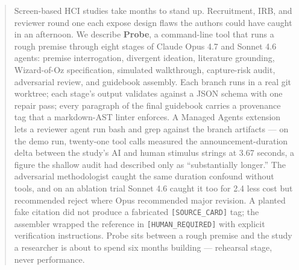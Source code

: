 \begin{abstract}
Screen-based HCI studies take months to stand up. Recruitment, IRB, and reviewer round one each expose design flaws the authors could have caught in an afternoon. We describe \textbf{Probe}, a command-line tool that runs a rough premise through eight stages of Claude Opus 4.7 and Sonnet 4.6 agents: premise interrogation, divergent ideation, literature grounding, Wizard-of-Oz specification, simulated walkthrough, capture-risk audit, adversarial review, and guidebook assembly. Each branch runs in a real git worktree; each stage's output validates against a JSON schema with one repair pass; every paragraph of the final guidebook carries a provenance tag that a markdown-AST linter enforces. A Managed Agents extension lets a reviewer agent run bash and grep against the branch artifacts --- on the demo run, twenty-one tool calls measured the announcement-duration delta between the study's AI and human stimulus strings at 3.67 seconds, a figure the shallow audit had described only as ``substantially longer.'' The adversarial methodologist caught the same duration confound without tools, and on an ablation trial Sonnet 4.6 caught it too for 2.4\texttimes{} less cost but recommended reject where Opus recommended major revision. A planted fake citation did not produce a fabricated \texttt{[SOURCE\_CARD]} tag; the assembler wrapped the reference in \texttt{[HUMAN\_REQUIRED]} with explicit verification instructions. Probe sits between a rough premise and the study a researcher is about to spend six months building --- rehearsal stage, never performance.
\end{abstract}
